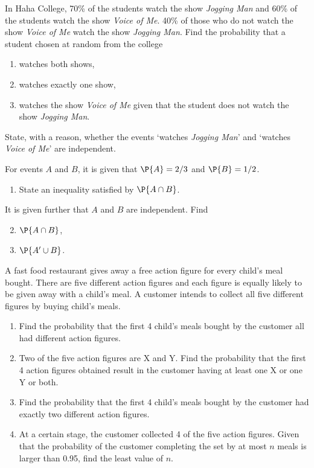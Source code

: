 \begin{problem}
    In Haha College, 70\% of the students watch the show \textit{Jogging Man} and 60\% of the students watch the show \textit{Voice of Me}. 40\% of those who do not watch the show \textit{Voice of Me} watch the show \textit{Jogging Man}. Find the probability that a student chosen at random from the college
    \begin{enumerate}
        \item watches both shows,
        \item watches exactly one show,
        \item watches the show \textit{Voice of Me} given that the student does not watch the show \textit{Jogging Man}.
    \end{enumerate}

    State, with a reason, whether the events `watches \textit{Jogging Man}' and `watches \textit{Voice of Me}' are independent.
\end{problem}

\begin{problem}
    For events $A$ and $B$, it is given that $\P{A} = 2/3$ and $\P{B} = 1/2$.
    
    \begin{enumerate}
        \item State an inequality satisfied by $\P{A \cap B}$.
    \end{enumerate}

    It is given further that $A$ and $B$ are independent. Find
    \begin{enumerate}
        \setcounter{enumi}{1}
        \item $\P{A \cap B}$,
        \item $\P{A' \cup B}$.
    \end{enumerate}
\end{problem}

\begin{problem}[\chili]
    A fast food restaurant gives away a free action figure for every child's meal bought. There are five different action figures and each figure is equally likely to be given away with a child's meal. A customer intends to collect all five different figures by buying child's meals.

    \begin{enumerate}
        \item Find the probability that the first 4 child's meals bought by the customer all had different action figures.
        \item Two of the five action figures are X and Y. Find the probability that the first 4 action figures obtained result in the customer having at least one X or one Y or both.
        \item Find the probability that the first 4 child's meals bought by the customer had exactly two different action figures.
        \item At a certain stage, the customer collected 4 of the five action figures. Given that the probability of the customer completing the set by at most $n$ meals is larger than 0.95, find the least value of $n$.
    \end{enumerate}
\end{problem}